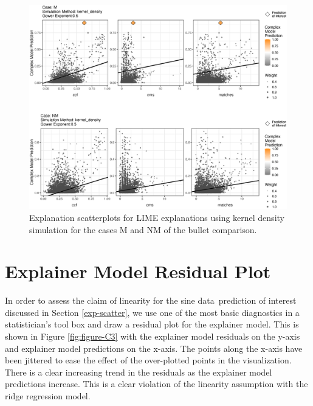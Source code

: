 \documentclass[AMS,STIX2COL]{WileyNJD-v2}\usepackage[]{graphicx}\usepackage[]{color}
\newenvironment{knitrout}{}{} %
\newcommand{\data}{sine data}
\begin{document}
\begin{figure}[!thp]
\begin{knitrout}
\color{fgcolor}

{\centering \includegraphics[width=6.5in]{figure-B2-1} 

}



\end{knitrout}
\caption{Explanation scatterplots for LIME explanations using kernel density simulation for the cases M and NM of the bullet comparison.}
\label{fig:figure-B2}
\end{figure}

\section{Explainer Model Residual Plot} \label{residual-plot}

In order to assess the claim of linearity for the \data \ prediction of interest discussed in Section \ref{exp-scatter}, we use one of the most basic diagnostics in a statistician's tool box and draw a residual plot for the explainer model. This is shown in Figure \ref{fig:figure-C3} with the explainer model residuals on the y-axis and explainer model predictions on the x-axis. The points along the x-axis have been jittered to ease the effect of the over-plotted points in the visualization. There is a clear increasing trend in the residuals as the explainer model predictions increase. This is a clear violation of the linearity assumption with the ridge regression model.
\end{document}

